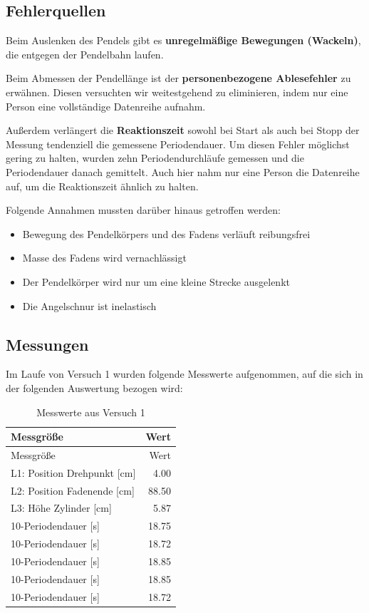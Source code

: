 \documentclass[
  9pt,
]{article}
\providecommand{\tightlist}{%
  \setlength{\itemsep}{0pt}\setlength{\parskip}{0pt}}
\begin{document}
\hypertarget{fehlerquellen}{%
\subsection{Fehlerquellen}\label{fehlerquellen}}

Beim Auslenken des Pendels gibt es \textbf{unregelmäßige Bewegungen
(Wackeln)}, die entgegen der Pendelbahn laufen.

Beim Abmessen der Pendellänge ist der \textbf{personenbezogene
Ablesefehler} zu erwähnen. Diesen versuchten wir weitestgehend zu
eliminieren, indem nur eine Person eine vollständige Datenreihe aufnahm.

Außerdem verlängert die \textbf{Reaktionszeit} sowohl bei Start als auch
bei Stopp der Messung tendenziell die gemessene Periodendauer. Um diesen
Fehler möglichst gering zu halten, wurden zehn Periodendurchläufe
gemessen und die Periodendauer danach gemittelt. Auch hier nahm nur eine
Person die Datenreihe auf, um die Reaktionszeit ähnlich zu halten.

Folgende Annahmen mussten darüber hinaus getroffen werden:

\begin{itemize}
\tightlist
\item
  Bewegung des Pendelkörpers und des Fadens verläuft reibungsfrei
\item
  Masse des Fadens wird vernachlässigt
\item
  Der Pendelkörper wird nur um eine kleine Strecke ausgelenkt
\item
  Die Angelschnur ist inelastisch
\end{itemize}

\hypertarget{messungen}{%
\subsection{Messungen}\label{messungen}}

Im Laufe von Versuch 1 wurden folgende Messwerte aufgenommen, auf die
sich in der folgenden Auswertung bezogen wird:

\begin{longtable}[]{@{}lr@{}}
\caption{Messwerte aus Versuch 1}\tabularnewline
\toprule()
Messgröße & Wert \\
\midrule()
\endfirsthead
\toprule()
Messgröße & Wert \\
\midrule()
\endhead
L1: Position Drehpunkt {[}cm{]} & 4.00 \\
L2: Position Fadenende {[}cm{]} & 88.50 \\
L3: Höhe Zylinder {[}cm{]} & 5.87 \\
10-Periodendauer {[}s{]} & 18.75 \\
10-Periodendauer {[}s{]} & 18.72 \\
10-Periodendauer {[}s{]} & 18.85 \\
10-Periodendauer {[}s{]} & 18.85 \\
10-Periodendauer {[}s{]} & 18.72 \\
\bottomrule()
\end{longtable}
\end{document}
